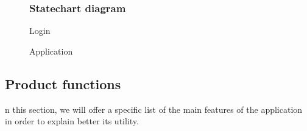 \documentclass[12pt,titlepage]{article}
\begin{document}
 \clearpage
\newpage
 \begin{figure}
\subsubsection{Statechart diagram }\label{sec:mod1}
\centering
{}
\caption{Login}
\par
{}
\caption{Application}
\end{figure}

\clearpage
\newpage
 
\pagebreak 
\subsection{Product functions}\label{sec:mod1}
n this section, we will offer a specific list of the main features of the application in order to explain better its utility. 
\end{document}
